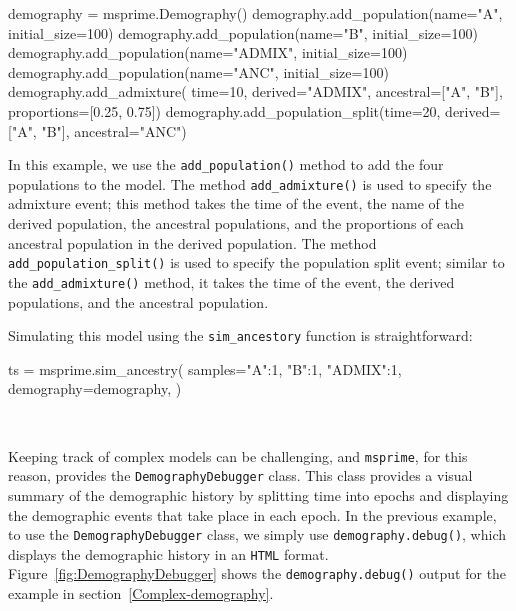 \documentclass[graybox]{svmult}
\newcommand{\msprime}[0]{\texttt{msprime}}
\begin{document}
\begin{pythoncode}
    demography = msprime.Demography()
    demography.add_population(name="A", initial_size=100)
    demography.add_population(name="B", initial_size=100)
    demography.add_population(name="ADMIX", initial_size=100)
    demography.add_population(name="ANC", initial_size=100)
    demography.add_admixture(
        time=10, derived="ADMIX",
        ancestral=["A", "B"], proportions=[0.25, 0.75])
    demography.add_population_split(time=20,
        derived=["A", "B"], ancestral="ANC")
\end{pythoncode}

In this example, we use the \texttt{add\_population()} method to add the four populations
to the model. The method \texttt{add\_admixture()} is used to specify the admixture event;
this method takes the time of the event, the name of the derived population, the ancestral
populations, and the proportions of each ancestral population in the derived population.
The method \texttt{add\_population\_split()} is used to specify the population split event;
similar to the \texttt{add\_admixture()} method, it takes the time of the event, the derived
populations, and the ancestral population.

Simulating this model using the \texttt{sim\_ancestory} function is straightforward:
\begin{pythoncode}
ts = msprime.sim_ancestry(
    samples={"A":1, "B":1, "ADMIX":1},
    demography=demography,
    )
\end{pythoncode}

\label{demography-debugger}\

Keeping track of complex models can be challenging, and \msprime, for this reason,
provides the \texttt{DemographyDebugger} class. This class provides a visual summary of
the demographic history by splitting time into epochs and displaying the demographic
events that take place in each epoch. In the previous example, to use the \texttt{DemographyDebugger} class,
we simply use \texttt{demography.debug()}, which displays the demographic history in an \texttt{HTML}
format. Figure~\ref{fig:DemographyDebugger} shows the \texttt{demography.debug()} output for the example in section~\ref{Complex-demography}.
\end{document}
